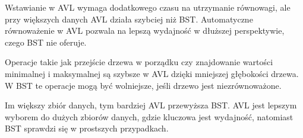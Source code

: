 \documentclass{article}
\begin{document}
Wstawianie w AVL wymaga dodatkowego czasu na utrzymanie równowagi, ale przy większych danych AVL działa szybciej niż BST. Automatyczne równoważenie w AVL pozwala na lepszą wydajność w dłuższej perspektywie, czego BST nie oferuje.

Operacje takie jak przejście drzewa w porządku czy znajdowanie wartości minimalnej i maksymalnej są szybsze w AVL dzięki mniejszej głębokości drzewa. W BST te operacje mogą być wolniejsze, jeśli drzewo jest niezrównoważone.

Im większy zbiór danych, tym bardziej AVL przewyższa BST. AVL jest lepszym wyborem do dużych zbiorów danych, gdzie kluczowa jest wydajność, natomiast BST sprawdzi się w prostszych przypadkach.
	
\end{document}

